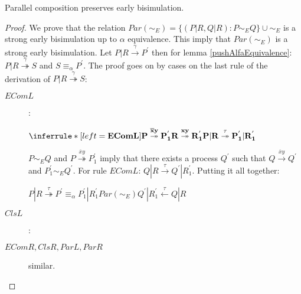 \begin{lemma}\label{parallelCompositionPreservesEarlyBisimulation}
  Parallel composition preserves early bisimulation.
  \begin{proof}
    We prove that the relation $Par(\sim_{E})=\{(P|R, Q|R): P\sim_{E} Q\} \cup \sim_{E}$ is a strong early bisimulation up to $\alpha$ equivalence. This imply that $Par(\sim_{E})$ is a strong early bisimulation. Let $P|R \xrightarrow{\gamma} P^{'}$ then for lemma \ref{pushAlfaEquivalence}: $P|R \stackrel{\gamma}{\twoheadrightarrow} S$ and $S\equiv_{\alpha} P^{'}$. The proof goes on by cases on the last rule of the derivation of $P|R \stackrel{\gamma}{\twoheadrightarrow} S$:
    \begin{description}
      \item[$EComL$]:
	    \begin{center}
	      $\inferrule* [left=\bf{EComL}]{
		      P \stackrel{\overline{x}y}{\twoheadrightarrow} P_{1}^{'}
		    \\
		      R \stackrel{xy}{\twoheadrightarrow} R_{1}^{'}
		  }{
		    P|R \stackrel{\tau}{\twoheadrightarrow} P_{1}^{'}|R_{1}^{'}
		  }$
	    \end{center}
	$P\sim_{E} Q$ and $P \stackrel{\overline{x}y}{\twoheadrightarrow} P_{1}^{'}$ imply that there exists a process $Q^{'}$ such that $Q \xrightarrow{\overline{x}y} Q^{'}$ and $P_{1}^{'}\sim_{E} Q^{'}$. For rule $EComL$: $Q|R \xrightarrow{\tau} Q^{'}|R_{1}^{'}$. Putting it all together:
	\begin{center}
	  $P|R \stackrel{\tau}{\twoheadrightarrow} P^{'} \equiv_{\alpha} P_{1}^{'}|R_{1}^{'} Par(\sim_{E}) Q^{'}|R_{1}^{'} \stackrel{\tau}{\leftarrow} Q|R$
	\end{center}
      \item[$ClsL$]:
      \item[$EComR, ClsR, ParL, ParR$] similar.
    \end{description}
  \end{proof}
\end{lemma}


